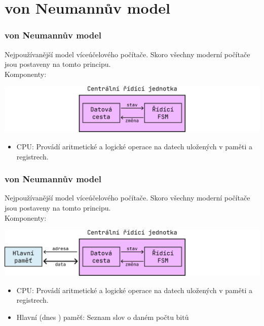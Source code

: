\documentclass[aspectratio=169,11pt,svgnames,handout]{beamer}
\begin{document}
\section{von Neumannův model}

\begin{frame}
 \frametitle{von Neumannův model}
 Nejpoužívanější model víceúčelového počítače. Skoro všechny moderní počítače
 jsou postaveny na tomto principu.\\
 \pause
 Komponenty:
 \vspace*{-1em}
 \begin{center}
  \includegraphics[width=.75\textwidth]{von-neumann-1.pdf}
 \end{center}
 \begin{itemize}[label=\textbullet]
  \item \alert{CPU}: Provádí aritmetické a logické operace na datech uložených v
   paměti a registrech.
 \end{itemize}
\end{frame}

\begin{frame}
 \frametitle{von Neumannův model}
 Nejpoužívanější model víceúčelového počítače. Skoro všechny moderní počítače
 jsou postaveny na tomto principu.\\
 \pause
 Komponenty:
 \vspace*{-1em}
 \begin{center}
  \includegraphics[width=.75\textwidth]{von-neumann-2.pdf}
 \end{center}
 \begin{itemize}[label=\textbullet]
  \item \alert{CPU}: Provádí aritmetické a logické operace na datech uložených v
   paměti a registrech.
  \item \alert{Hlavní (dnes ) paměť}: Seznam \alert{slov} o daném
   počtu \alert{bitů} 
 \end{itemize}
\end{frame}
\end{document}
